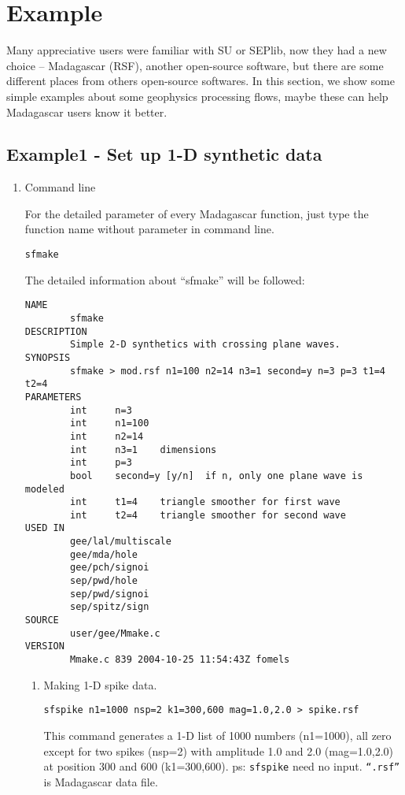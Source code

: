 \section{Example}

Many appreciative users were familiar with SU or SEPlib,
now they had a new choice -- Madagascar (RSF), another 
open-source software, but there are some different places 
from others open-source softwares. In this section,
we show some simple examples about some geophysics processing 
flows, maybe these can help Madagascar users know
it better.

\subsection{Example1 - Set up 1-D synthetic data}

\begin{enumerate}
\item Command line

For the detailed parameter of every Madagascar function, just type
the function name without parameter in command line.

\begin{verbatim}
sfmake
\end{verbatim} 

The detailed information about ``sfmake'' will be followed:

\begin{verbatim}
NAME
        sfmake
DESCRIPTION
        Simple 2-D synthetics with crossing plane waves.
SYNOPSIS
        sfmake > mod.rsf n1=100 n2=14 n3=1 second=y n=3 p=3 t1=4 t2=4
PARAMETERS
        int     n=3     
        int     n1=100  
        int     n2=14   
        int     n3=1    dimensions 
        int     p=3     
        bool    second=y [y/n]  if n, only one plane wave is modeled 
        int     t1=4    triangle smoother for first wave 
        int     t2=4    triangle smoother for second wave
USED IN
        gee/lal/multiscale
        gee/mda/hole
        gee/pch/signoi
        sep/pwd/hole
        sep/pwd/signoi
        sep/spitz/sign
SOURCE
        user/gee/Mmake.c
VERSION
        Mmake.c 839 2004-10-25 11:54:43Z fomels
\end{verbatim}

{\begin{enumerate}
\item Making 1-D spike data.

\begin{verbatim}
sfspike n1=1000 nsp=2 k1=300,600 mag=1.0,2.0 > spike.rsf
\end{verbatim}
This command generates a 1-D list of 1000 numbers (n1=1000), all zero
except for two spikes (nsp=2) with amplitude 1.0 and 2.0 (mag=1.0,2.0)
at position 300 and 600 (k1=300,600). ps: \texttt{sfspike} need no input.
\texttt{``.rsf''} is Madagascar data file.


\end{enumerate}}
\end{enumerate}
